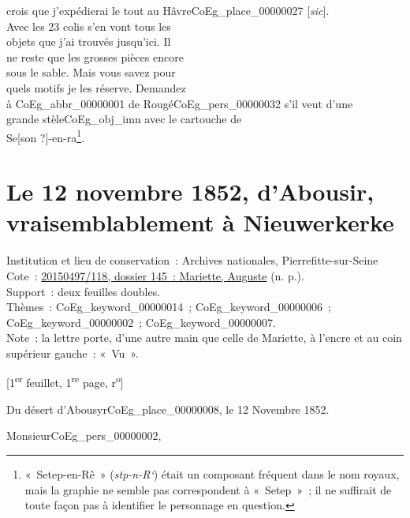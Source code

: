 \documentclass{book}
\begin{document}
crois que j’expédierai le tout au Hâvre\gls{CoEg_place_00000027} {[\textit{sic}]}.\\
Avec les 23 colis s’en vont tous les\\
objets que j’ai trouvés jusqu’ici. Il\\
ne reste que les grosses pièces encore\\
sous le sable. Mais vous savez pour\\
quels motifs je les réserve. Demandez\\
à \gls{CoEg_abbr_00000001} de Rougé\gls{CoEg_pers_00000032} s’il veut d’une\\
grande stèle\gls{CoEg_obj_imn} avec le cartouche de\\
Se{[son ?]}-en-ra\footnote{«~Setep-en-Rê~» (\textit{stp-n-R`}) était un composant fréquent dans le nom royaux, mais la graphie ne semble pas correspondent à «~Setep~»~; il ne suffirait de toute façon pas à identifier le personnage en question.}.
\hypertarget{CoEg_Mariette_1852-11-12}{}
\section*{Le 12 novembre 1852, d’Abousir, vraisemblablement à Nieuwerkerke} 
{\footnotesize
\noindent Institution et lieu de conservation~: Archives nationales, Pierrefitte-sur-Seine\\
Cote~: \hyperlink{CoEg_Mariette_ms_001}{20150497/118, dossier 145~: Mariette, Auguste} (n. p.).\\
Support~: deux feuilles doubles.\\
Thèmes~: \gls{CoEg_keyword_00000014}~; \gls{CoEg_keyword_00000006}~; \gls{CoEg_keyword_00000002}~;  \gls{CoEg_keyword_00000007}.\\
Note~: la lettre porte, d’une autre main que celle de Mariette, à l’encre et au coin supérieur gauche~: «~Vu~».
\begin{center} {[1\textsuperscript{er} feuillet, 1\textsuperscript{re} page, r\textsuperscript{o}]}\end{center}}
\begin{flushright}Du désert d’Abousyr\gls{CoEg_place_00000008}, le 12 Novembre 1852.\end{flushright}

\hspace{1cm}Monsieur\gls{CoEg_pers_00000002},\\
\end{document}
